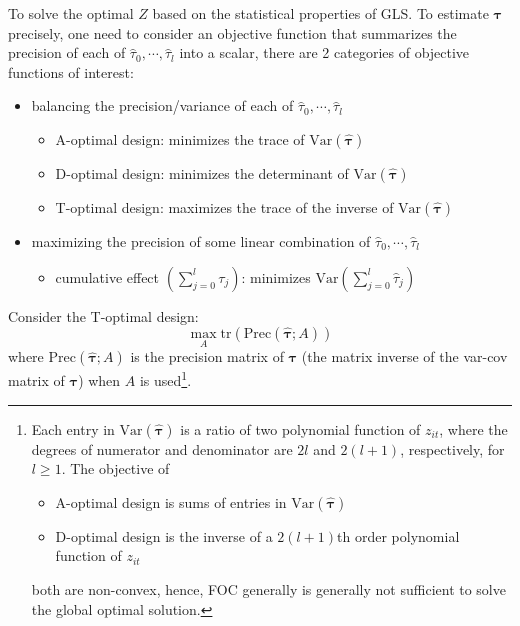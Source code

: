 \documentclass[twoside]{article}
\begin{document}
To solve the optimal $Z$ based on the statistical properties of GLS. To estimate $\boldsymbol{\tau}$ precisely, one need to consider an objective function that summarizes the precision of each of $\hat{\tau}_0,\cdots,\hat{\tau}_l$ into a scalar, there are 2 categories of objective functions of interest:
\begin{itemize}
    \item balancing the precision/variance of each of $\hat{\tau}_0,\cdots,\hat{\tau}_l$
    \begin{itemize}
        \item A-optimal design: minimizes the trace of $\mathrm{Var}(\hat{\boldsymbol{\tau}})$
        \item D-optimal design: minimizes the determinant of $\mathrm{Var}(\hat{\boldsymbol{\tau}})$
        \item T-optimal design: maximizes the trace of the inverse of $\mathrm{Var}(\hat{\boldsymbol{\tau}})$
    \end{itemize}
    \item maximizing the precision of some linear combination of $\hat{\tau}_0,\cdots,\hat{\tau}_l$
    \begin{itemize}
        \item cumulative effect $\left(\sum^l_{j=0}\tau_j\right)$: minimizes $\mathrm{Var}\left(\sum^l_{j=0}\hat{\tau}_j\right)$
    \end{itemize}
\end{itemize}

Consider the T-optimal design: 
\begin{equation}\label{eq3-2:xiongetal2024}
    \max_A\mathrm{tr}\left(\mathrm{Prec}\left(\hat{\boldsymbol{\tau}};A\right)\right)
\end{equation}
where $\mathrm{Prec}\left(\hat{\boldsymbol{\tau}};A\right)$ is the precision matrix of $\boldsymbol{\tau}$ (the matrix inverse of the var-cov matrix of $\boldsymbol{\tau}$) when $A$ is used\footnote{Each entry in $\mathrm{Var}\left(\hat{\boldsymbol{\tau}}\right)$ is a ratio of two polynomial function of $z_{it}$, where the degrees of numerator and denominator are $2l$ and $2(l+1)$, respectively, for $l\geq 1$. The objective of 
\begin{itemize}
    \item A-optimal design is sums of entries in $\mathrm{Var}\left(\hat{\boldsymbol{\tau}}\right)$
    \item D-optimal design is the inverse of a $2(l+1)$th order polynomial function of $z_{it}$
\end{itemize}
both are non-convex, hence, FOC generally is generally not sufficient to solve the global optimal solution. }.
\end{document}
